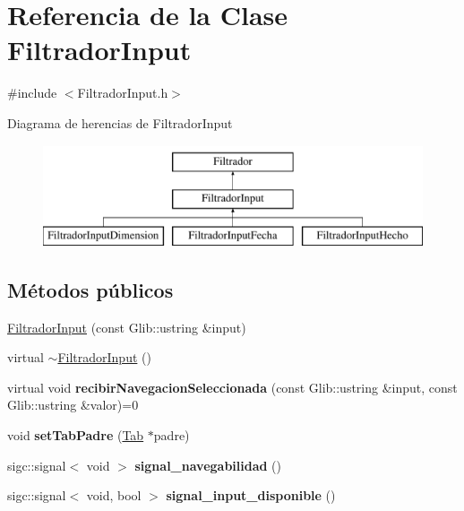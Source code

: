 \hypertarget{classFiltradorInput}{\section{\-Referencia de la \-Clase \-Filtrador\-Input}
\label{classFiltradorInput}
}


{\ttfamily \#include $<$\-Filtrador\-Input.\-h$>$}

\-Diagrama de herencias de \-Filtrador\-Input\begin{figure}[H]
\begin{center}
\leavevmode
\includegraphics[height=3.000000cm]{classFiltradorInput}
\end{center}
\end{figure}
\subsection*{\-Métodos públicos}
\begin{DoxyCompactItemize}
\item 
\hyperlink{classFiltradorInput_a36209dac5c768231d5ad630ea3676ad8}{\-Filtrador\-Input} (const \-Glib\-::ustring \&input)
\item 
virtual \hyperlink{classFiltradorInput_aaaaf737370b6cf9fbf7d6d00f524fb33}{$\sim$\-Filtrador\-Input} ()
\item 
\hypertarget{classFiltradorInput_abea40f0c14afff6589aea9c61afb1a24}{virtual void {\bfseries recibir\-Navegacion\-Seleccionada} (const \-Glib\-::ustring \&input, const \-Glib\-::ustring \&valor)=0}\label{classFiltradorInput_abea40f0c14afff6589aea9c61afb1a24}

\item 
\hypertarget{classFiltradorInput_a16bb2d588c5397acf42b2b64f1d8f2b9}{void {\bfseries set\-Tab\-Padre} (\hyperlink{classTab}{\-Tab} $\ast$padre)}\label{classFiltradorInput_a16bb2d588c5397acf42b2b64f1d8f2b9}

\item 
\hypertarget{classFiltradorInput_a290ba2ec379f053c78a5e9c56ddae6ab}{sigc\-::signal$<$ void $>$ {\bfseries signal\-\_\-navegabilidad} ()}\label{classFiltradorInput_a290ba2ec379f053c78a5e9c56ddae6ab}

\item 
\hypertarget{classFiltradorInput_a94bf43964d954a7fb30aa6101e930eff}{sigc\-::signal$<$ void, bool $>$ {\bfseries signal\-\_\-input\-\_\-disponible} ()}\label{classFiltradorInput_a94bf43964d954a7fb30aa6101e930eff}

\end{DoxyCompactItemize}
